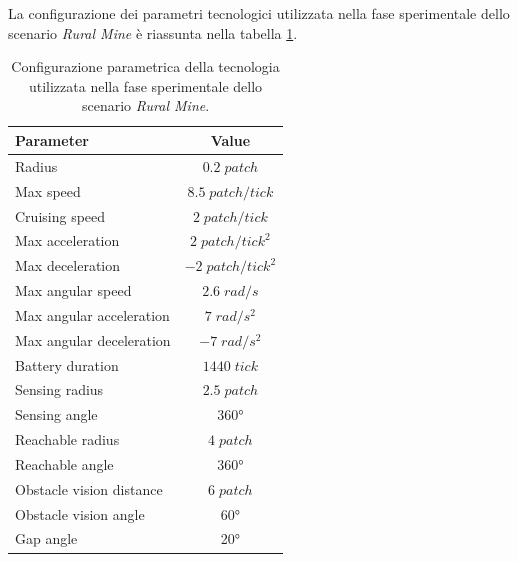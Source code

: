 La configurazione dei parametri tecnologici utilizzata nella fase sperimentale dello scenario \textit{Rural Mine} è  riassunta nella tabella \ref{tabella_parametri_ruralMine}.

\begin{table}[H]
    \centering
    
    \begin{tabular}{|l|c|}
    \hline
    \textbf{Parameter}              & \textbf{Value}                \\ \hline
    Radius                          & $0.2 \; patch$                \\ \hline
    Max speed                       & $8.5 \; patch/tick$           \\ \hline
    Cruising speed                  & $2 \; patch/tick$             \\ \hline
    Max acceleration                & $2 \; patch/tick^{2}$         \\ \hline
    Max deceleration                & $-2 \; patch/tick^{2}$        \\ \hline
    Max angular speed               & $2.6 \; rad/s$                \\ \hline
    Max angular acceleration        & $7 \; rad/s^{2}$              \\ \hline
    Max angular deceleration        & $-7 \; rad/s^{2}$             \\ \hline
    Battery duration                & $1440 \; tick$                \\ \hline
    Sensing radius                  & $2.5 \; patch$                \\ \hline
    Sensing angle                   & \ang{360}                        \\ \hline
    Reachable radius                & $4 \; patch$                  \\ \hline
    Reachable angle                 & \ang{360}                        \\ \hline
    Obstacle vision distance        & $6 \; patch$                  \\ \hline
    Obstacle vision angle           & \ang{60}                        \\ \hline
    Gap angle                       & \ang{20}                        \\ \hline
    \end{tabular}%
    
    \caption{Configurazione parametrica della tecnologia utilizzata nella fase sperimentale dello scenario \textit{Rural Mine}.}
    \label{tabella_parametri_ruralMine}
\end{table}

